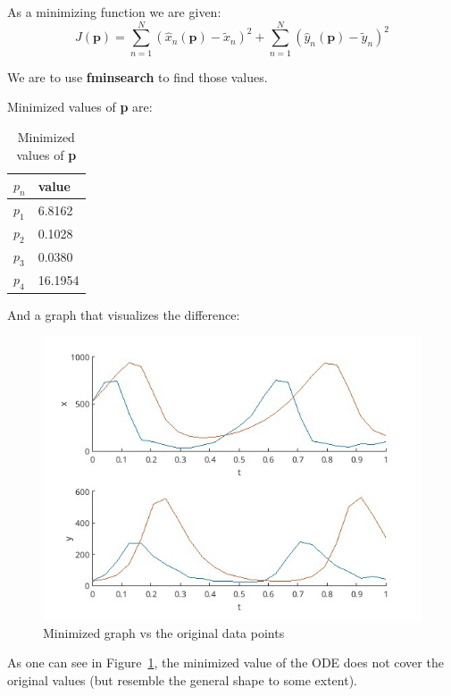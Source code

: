 \documentclass[11pt]{article}
\begin{document}
As a minimizing function we are given:
$$J(\textbf{p}) = \sum_{n=1}^N (\hat{x}_n(\textbf{p}) - \tilde{x}_n)^2 +
\sum_{n=1}^N (\hat{y}_n(\textbf{p}) - \tilde{y}_n)^2$$

We are to use \textbf{fminsearch} to find those values.

Minimized values of \textbf{p} are:

\begin{table}[H]
    \caption{Minimized values of \textbf{p}}
    \label{tab:aggregated_error}
    \begin{center}
        \begin{tabular}{l|l}
            $p_n$ & value \\
            \hline
            $p_1$ & 6.8162 \\
            $p_2$ & 0.1028 \\
            $p_3$ & 0.0380 \\
            $p_4$ & 16.1954 \\
        \end{tabular}
    \end{center}
\end{table}

And a graph that visualizes the difference:
\begin{figure}[H]
    \includegraphics[width=\textwidth]{./minimized_graphs.jpg}
    \caption{Minimized graph vs the original data points}
    \label{fig:minimized_graphs}
\end{figure}

As one can see in Figure~\ref{fig:minimized_graphs}, the minimized value of the
ODE does not cover the original values (but resemble the general shape to some
extent).
\end{document}
